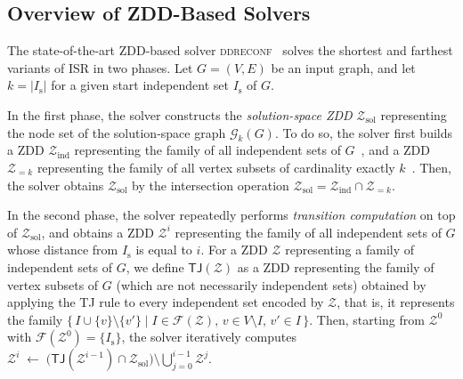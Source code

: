 \documentclass[conference]{IEEEtran}
\newcommand{\ini}{\mathrm{s}}
\newcommand{\solgraph}[2]{\mathcal{G}_{#1}(#2)}
\newcommand{\Z}{\mathcal{Z}}
\newcommand{\sets}{\mathcal{F}}
\newcommand{\zind}{\mathcal{Z}_{\mathrm{ind}}}
\newcommand{\zsol}{\mathcal{Z}_{\mathrm{sol}}}
\newcommand{\ISR}{\textsc{ISR}\xspace}
\newcommand{\TJrule}{\textsc{TJ}\xspace}
\begin{document}

\subsection{Overview of ZDD-Based Solvers}
\label{subsec:zdd_solver}

The state-of-the-art ZDD-based solver \textsc{ddreconf}~\cite{ItoKNSSTT23} solves the shortest and farthest variants of \ISR in two phases.
Let $G = (V,E)$ be an input graph, and let $k = |I_\ini|$ for a given start independent set $I_\ini$ of $G$. 

In the first phase, the solver constructs the \emph{solution-space ZDD} $\zsol$ representing the node set of the solution-space graph $\solgraph{k}{G}$.
To do so, the solver first builds a ZDD $\zind$ representing the family of all independent sets of
$G$~\cite{Hayase1995}, and a ZDD $\Z_{=k}$ representing the family of all vertex subsets of cardinality exactly $k$~\cite{knuth:taocp41}. 
Then, the solver obtains $\zsol$ by the intersection operation $\zsol = \zind \cap \Z_{=k}$.

In the second phase, the solver repeatedly performs \emph{transition computation}
on top of $\zsol$, and obtains a ZDD $\Z^{i}$ representing the family of all
independent sets of $G$ whose distance from $I_\ini$ is equal to $i$.
For a ZDD $\Z$ representing a family of independent sets of $G$, we define $\mathsf{TJ}(\Z)$ as a ZDD representing the family of vertex subsets of $G$ (which are not necessarily independent sets) obtained by applying the \TJrule rule to every independent set encoded
by $\Z$, that is, it represents the family
$\{\, I \cup \{v\} \setminus \{v'\} \mid I \in \sets(\Z),\,
  v \in V \setminus I,\, v' \in I \,\}$. 
Then, starting from $\Z^{0}$ with $\sets(\Z^{0}) = \{I_\ini\}$, the solver iteratively computes 
$\Z^{i} \;\gets\; \bigl(\mathsf{TJ}(\Z^{i-1}) \cap \zsol\bigr) \setminus \bigcup_{j=0}^{i-1} \Z^{j}$.
\end{document}
